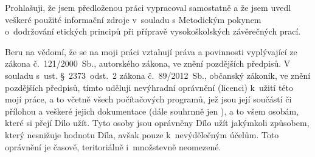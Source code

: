 \documentclass[czech,bachelor,unicode]{ctufit-thesis}
\theoremstyle{plain}
\theoremstyle{definition}
\theoremstyle{remark}
\numberwithin{theorem}{chapter}
\begin{document}
\begin{declarationpage}
Prohlašuji, že jsem předloženou práci vypracoval samostatně a že jsem uvedl veškeré
použité informační zdroje v~souladu s Metodickým pokynem o~dodržování etických
principů při přípravě vysokoškolských závěrečných prací.

Beru na vědomí, že se na moji práci vztahují práva a povinnosti vyplývající ze zákona
č.~121/2000~Sb., autorského zákona, ve znění pozdějších předpisů. V souladu s~ust.
§~2373~odst.~2 zákona č.~89/2012~Sb., občanský zákoník, ve znění pozdějších předpisů,
tímto uděluji nevýhradní oprávnění (licenci) k~užití této mojí práce, a to včetně všech
počítačových programů, jež jsou její součástí či přílohou a veškeré jejich
dokumentace (dále souhrnně jen ), a to všem osobám, které si přejí Dílo užít.
Tyto osoby jsou oprávněny Dílo užít jakýmkoli způsobem, který nesnižuje hodnotu
Díla, avšak pouze k~nevýdělečným účelům. Toto oprávnění je časově, teritoriálně
i~množstevně neomezené.
\end{declarationpage}

\printabstractpage %

\end{document}
